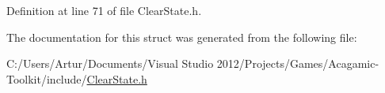Definition at line 71 of file Clear\-State.\-h.



The documentation for this struct was generated from the following file\-:\begin{DoxyCompactItemize}
\item 
C\-:/\-Users/\-Artur/\-Documents/\-Visual Studio 2012/\-Projects/\-Games/\-Acagamic-\/\-Toolkit/include/\hyperlink{_clear_state_8h}{Clear\-State.\-h}\end{DoxyCompactItemize}
